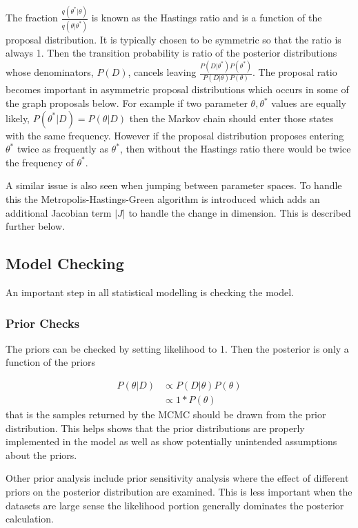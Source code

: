 \documentclass[11pt,a4paper]{article}
\numberwithin{equation}{section}
\begin{document}
The fraction \(\frac{q(\theta^*|\theta)}{q(\theta|\theta^*)}\) is known
as the Hastings ratio and is a function of the proposal distribution. It
is typically chosen to be symmetric so that the ratio is always 1. Then
the transition probability is ratio of the posterior distributions whose
denominators, \(P(D)\), cancels leaving
\(\frac{P(D|\theta^*)P(\theta^*)}{P(D|\theta)P(\theta)}\). The proposal
ratio becomes important in asymmetric proposal distributions which
occurs in some of the graph proposals below. For example if two
parameter \(\theta, \theta^*\) values are equally likely,
\(P(\theta^*|D) = P(\theta|D)\) then the Markov chain should enter those
states with the same frequency. However if the proposal distribution
proposes entering \(\theta^*\) twice as frequently as \(\theta^*\), then
without the Hastings ratio there would be twice the frequency of
\(\theta^*\).

A similar issue is also seen when jumping between parameter spaces. To
handle this the Metropolis-Hastings-Green algorithm is introduced which
adds an additional Jacobian term \(|J|\) to handle the change in
dimension. This is described further below.

\hypertarget{model-checking}{%
\subsection{Model Checking}\label{model-checking}}

An important step in all statistical modelling is checking the model.

\hypertarget{prior-checks}{%
\subsubsection{Prior Checks}\label{prior-checks}}

The priors can be checked by setting likelihood to 1. Then the posterior
is only a function of the priors

\[\begin{aligned} P(\theta|D) & \propto P(D|\theta)P(\theta) \\ & \propto 1*P(\theta)  \end{aligned} \]
that is the samples returned by the MCMC should be drawn from the prior
distribution. This helps shows that the prior distributions are properly
implemented in the model as well as show potentially unintended
assumptions about the priors.

Other prior analysis include prior sensitivity analysis where the effect
of different priors on the posterior distribution are examined. This is
less important when the datasets are large sense the likelihood portion
generally dominates the posterior calculation.
\end{document}
